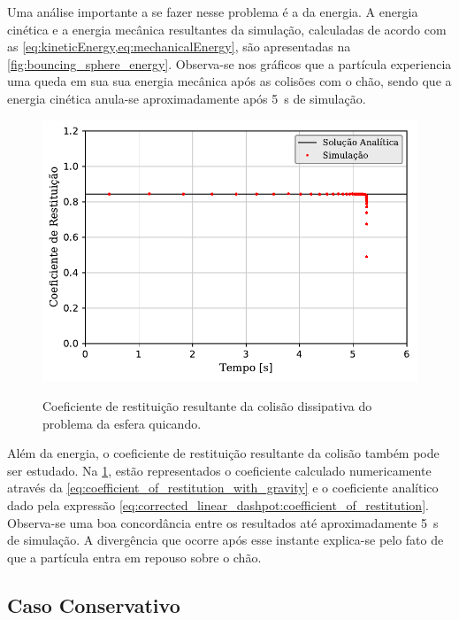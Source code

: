 Uma análise importante a se fazer nesse problema é a da energia. A energia cinética e a energia mecânica resultantes da simulação, calculadas de acordo com as \cref{eq:kineticEnergy,eq:mechanicalEnergy}, são apresentadas na \cref{fig:bouncing_sphere_energy}. Observa-se nos gráficos que a partícula experiencia uma queda em sua sua energia mecânica após as colisões com o chão, sendo que a energia cinética anula-se aproximadamente após \SI{5}{\second} de simulação.

\begin{figure}[h]
	\caption{Coeficiente de restituição resultante da colisão dissipativa do problema da esfera quicando.}
	\centering
		\includegraphics[scale=1]{images/bouncing_sphere/dissipative/coefficient_of_restitution.pdf}
	\label{fig:bouncing_sphere:dissipative:coefficient_of_restitution}
	\sourceMe
\end{figure}

Além da energia, o coeficiente de restituição resultante da colisão também pode ser estudado. Na \cref{fig:bouncing_sphere:dissipative:coefficient_of_restitution}, estão representados o coeficiente calculado numericamente através da \cref{eq:coefficient_of_restitution_with_gravity} e o coeficiente analítico dado pela expressão \eqref{eq:corrected_linear_dashpot:coefficient_of_restitution}. Observa-se uma boa concordância entre os resultados até aproximadamente \SI{5}{\second} de simulação. A divergência que ocorre após esse instante explica-se pelo fato de que a partícula entra em repouso sobre o chão.

\subsection{Caso Conservativo} \label{sec:results:bouncing_sphere:conservative}

